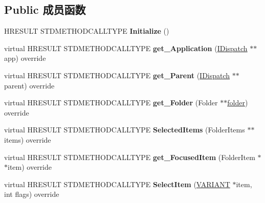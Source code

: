 \subsection*{Public 成员函数}
\begin{DoxyCompactItemize}
\item 
\mbox{\label{class_c_def_view_dual_a868f5a0c92f9de64c09688e14bc2b394}} 
H\+R\+E\+S\+U\+LT S\+T\+D\+M\+E\+T\+H\+O\+D\+C\+A\+L\+L\+T\+Y\+PE {\bfseries Initialize} ()
\item 
\mbox{\label{class_c_def_view_dual_aed3bd5ae0ea3696c23bc16576a9945a8}} 
virtual H\+R\+E\+S\+U\+LT S\+T\+D\+M\+E\+T\+H\+O\+D\+C\+A\+L\+L\+T\+Y\+PE {\bfseries get\+\_\+\+Application} (\hyperlink{interface_i_dispatch}{I\+Dispatch} $\ast$$\ast$app) override
\item 
\mbox{\label{class_c_def_view_dual_a3a56a2bb1e54f5f57f72860f699b9bc5}} 
virtual H\+R\+E\+S\+U\+LT S\+T\+D\+M\+E\+T\+H\+O\+D\+C\+A\+L\+L\+T\+Y\+PE {\bfseries get\+\_\+\+Parent} (\hyperlink{interface_i_dispatch}{I\+Dispatch} $\ast$$\ast$parent) override
\item 
\mbox{\label{class_c_def_view_dual_acab2a160e3663904b1f59dbfdec83737}} 
virtual H\+R\+E\+S\+U\+LT S\+T\+D\+M\+E\+T\+H\+O\+D\+C\+A\+L\+L\+T\+Y\+PE {\bfseries get\+\_\+\+Folder} (Folder $\ast$$\ast$\hyperlink{structfolder}{folder}) override
\item 
\mbox{\label{class_c_def_view_dual_ae6525f5e96846533b2ee9d5522a587cf}} 
virtual H\+R\+E\+S\+U\+LT S\+T\+D\+M\+E\+T\+H\+O\+D\+C\+A\+L\+L\+T\+Y\+PE {\bfseries Selected\+Items} (Folder\+Items $\ast$$\ast$items) override
\item 
\mbox{\label{class_c_def_view_dual_aaf4ee4728caed13355d086c48f4e8c7f}} 
virtual H\+R\+E\+S\+U\+LT S\+T\+D\+M\+E\+T\+H\+O\+D\+C\+A\+L\+L\+T\+Y\+PE {\bfseries get\+\_\+\+Focused\+Item} (Folder\+Item $\ast$$\ast$item) override
\item 
\mbox{\label{class_c_def_view_dual_adb3eee54c026465e304de4cb39626609}} 
virtual H\+R\+E\+S\+U\+LT S\+T\+D\+M\+E\+T\+H\+O\+D\+C\+A\+L\+L\+T\+Y\+PE {\bfseries Select\+Item} (\hyperlink{structtag_v_a_r_i_a_n_t}{V\+A\+R\+I\+A\+NT} $\ast$item, int flags) override
$$
\end{DoxyCompactItemize}
